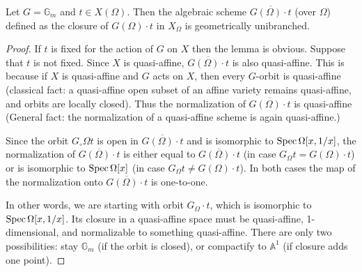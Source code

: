 \documentclass[12pt]{article}
\begin{document}
\begin{lemma}[2.5]
Let $G = \mathbb{G}_m$ and $t \in X(\Omega)$.  
Then the algebraic scheme $\overline{G(\Omega)\cdot t}$ (over $\Omega$) defined as the closure of $G(\Omega)\cdot t$ in $X_\Omega$ is geometrically unibranched.
\end{lemma}

\begin{proof}
If $t$ is fixed for the action of $G$ on $X$ then the lemma is obvious.  
Suppose that $t$ is not fixed. Since $X$ is quasi-affine, $\overline{G(\Omega)\cdot t}$ is also quasi-affine. This is because if $X$ is quasi-affine and $G$ acts on $X$, then every $G$-orbit is quasi-affine (classical fact: a quasi-affine open subset of an affine variety remains quasi-affine, and orbits are locally closed). Thus the normalization of $\overline{G(\Omega)\cdot t}$ is quasi-affine (General fact: the normalization of a quasi-affine scheme is again quasi-affine.)

Since the orbit $G_\circ\Omega t$ is open in $\overline{G(\Omega)\cdot t}$ and is isomorphic to $\operatorname{Spec} \Omega[x,1/x]$, the normalization of $\overline{G(\Omega)\cdot t}$ is either equal to $\overline{G(\Omega)\cdot t}$ (in case $G_\Omega t = G(\Omega)\cdot t$) or is isomorphic to $\operatorname{Spec} \Omega[x]$ (in case $G_\Omega t \neq G(\Omega)\cdot t$).  
In both cases the map of the normalization onto $\overline{G(\Omega)\cdot t}$ is one-to-one.

In other words, we are starting with orbit $G_\Omega \cdot t$, which is isomorphic to $\operatorname{Spec} \Omega[x,1/x]$. Its closure in a quasi-affine space must be quasi-affine, 1-dimensional, and normalizable to something quasi-affine. There are only two possibilities: stay $\mathbb G_m$ (if the orbit is closed), or compactify to $\mathbb A^1$ (if closure adds one point). 
\end{proof}
\end{document}
